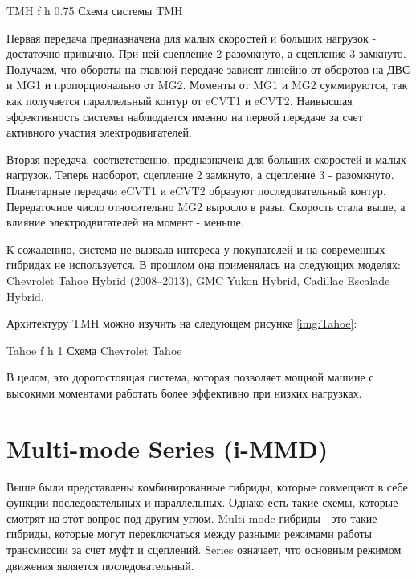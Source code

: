     {TMH} %
    {f} %
    {h} %
    {0.75\textwidth} %
    {Схема системы TMH \cite{hutchinson}} %

Первая передача предназначена для малых скоростей и больших нагрузок - достаточно привычно. При ней сцепление 2 разомкнуто, а сцепление 3 замкнуто. Получаем, что обороты на главной передаче зависят линейно от оборотов на ДВС и MG1 и пропорционально от MG2. Моменты от MG1 и MG2 суммируются, так как получается параллельный контур от eCVT1 и eCVT2. Наивысшая эффективность системы наблюдается именно на первой передаче за счет активного участия электродвигателей.

Вторая передача, соответственно, предназначена для больших скоростей и малых нагрузок. Теперь наоборот, сцепление 2 замкнуто, а сцепление 3 - разомкнуто. Планетарные передачи eCVT1 и eCVT2 образуют последовательный контур. Передаточное число относительно MG2 выросло в разы. Скорость стала выше, а влияние электродвигателей на момент - меньше.

К сожалению, система не вызвала интереса у покупателей и на современных гибридах не используется. В прошлом она применялась на следующих моделях:
Chevrolet Tahoe Hybrid (2008–2013), GMC Yukon Hybrid, Cadillac Escalade Hybrid.

\newpage

Архитектуру TMH можно изучить на следующем рисунке \ref{img:Tahoe}:

    {Tahoe} %
    {f} %
    {h} %
    {1\textwidth} %
    {Схема Chevrolet Tahoe \cite{hutchinson}} %

В целом, это дорогостоящая система, которая позволяет мощной машине с высокими моментами работать более эффективно при низких нагрузках.

\section{Multi-mode Series (i-MMD)} 

Выше были представлены комбинированные гибриды, которые совмещают в себе функции последовательных и параллельных. Однако есть такие схемы, которые смотрят на этот вопрос под другим углом. Multi-mode гибриды - это такие гибриды, которые могут переключаться между разными режимами работы трансмиссии за счет муфт и сцеплений. Series означает, что основным режимом движения является последовательный.

